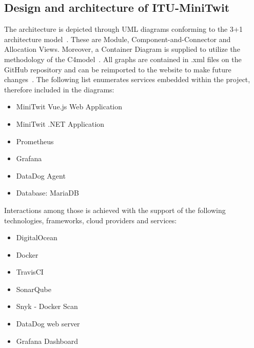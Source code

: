 \subsection{Design and architecture of ITU-MiniTwit}

The architecture is depicted through UML diagrams conforming to the 3+1 architecture model~\cite{drawio}. These are Module, Component-and-Connector and Allocation Views. Moreover, a Container Diagram is supplied to utilize the methodology of the C4model~\cite{c4model}. All graphs are contained in .xml files on the GitHub repository and can be reimported to the website to make future changes~\cite{architecturalViews}. The following list enumerates services embedded within the project, therefore included in the diagrams:

\begin{itemize}[noitemsep]
    \item MiniTwit Vue.js Web Application
    \item MiniTwit .NET Application
    \item Prometheus
    \item Grafana
    \item DataDog Agent
    \item Database: MariaDB
\end{itemize}

\vspace{3mm}

Interactions among those is achieved with the support of the following technologies, frameworks, cloud providers and services:

\begin{itemize}[noitemsep]
    \item DigitalOcean
    \item Docker
    \item TravisCI
    \item SonarQube
    \item Snyk - Docker Scan
    \item DataDog web server
    \item Grafana Dashboard
\end{itemize}








